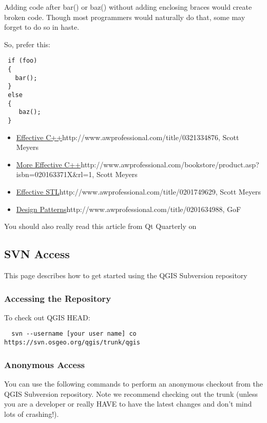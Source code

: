 Adding code after bar() or baz() without adding enclosing braces would create
broken code.  Though most programmers would naturally do that, some may forget
to do so in haste.

So, prefer this:

\begin{verbatim}
 if (foo)
 {
   bar();
 }
 else
 { 
    baz();
 } 
\end{verbatim}

\begin{itemize}
\item \url{Effective C++}{http://www.awprofessional.com/title/0321334876}, Scott Meyers
\item \url{More Effective C++}{http://www.awprofessional.com/bookstore/product.asp?isbn=020163371X\&rl=1}, Scott Meyers
\item \url{Effective STL}{http://www.awprofessional.com/title/0201749629}, Scott Meyers
\item \url{Design Patterns}{http://www.awprofessional.com/title/0201634988}, GoF
\end{itemize}

You should also really read this article from Qt Quarterly on 

\subsection{SVN Access}
This page describes how to get started using the QGIS Subversion repository

\subsubsection{Accessing the Repository}
To check out QGIS HEAD:

\begin{verbatim}
  svn --username [your user name] co https://svn.osgeo.org/qgis/trunk/qgis
\end{verbatim}

\subsubsection{Anonymous Access}
You can use the following commands to perform an anonymous checkout from the
QGIS Subversion repository.  Note we recommend checking out the trunk (unless
you are a developer or really HAVE to have the latest changes and don't mind
lots of crashing!).

